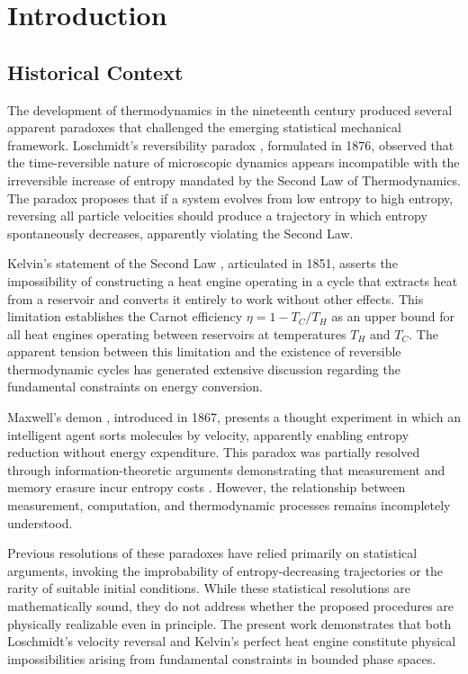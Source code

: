 \section{Introduction}
\label{sec:introduction}

\subsection{Historical Context}

The development of thermodynamics in the nineteenth century produced several apparent paradoxes that challenged the emerging statistical mechanical framework. Loschmidt's reversibility paradox \citep{loschmidt1876}, formulated in 1876, observed that the time-reversible nature of microscopic dynamics appears incompatible with the irreversible increase of entropy mandated by the Second Law of Thermodynamics. The paradox proposes that if a system evolves from low entropy to high entropy, reversing all particle velocities should produce a trajectory in which entropy spontaneously decreases, apparently violating the Second Law.

Kelvin's statement of the Second Law \citep{kelvin1851}, articulated in 1851, asserts the impossibility of constructing a heat engine operating in a cycle that extracts heat from a reservoir and converts it entirely to work without other effects. This limitation establishes the Carnot efficiency $\eta = 1 - T_C/T_H$ as an upper bound for all heat engines operating between reservoirs at temperatures $T_H$ and $T_C$. The apparent tension between this limitation and the existence of reversible thermodynamic cycles has generated extensive discussion regarding the fundamental constraints on energy conversion.

Maxwell's demon \citep{maxwell1871}, introduced in 1867, presents a thought experiment in which an intelligent agent sorts molecules by velocity, apparently enabling entropy reduction without energy expenditure. This paradox was partially resolved through information-theoretic arguments demonstrating that measurement and memory erasure incur entropy costs \citep{landauer1961,bennett1982}. However, the relationship between measurement, computation, and thermodynamic processes remains incompletely understood.

Previous resolutions of these paradoxes have relied primarily on statistical arguments, invoking the improbability of entropy-decreasing trajectories or the rarity of suitable initial conditions. While these statistical resolutions are mathematically sound, they do not address whether the proposed procedures are physically realizable even in principle. The present work demonstrates that both Loschmidt's velocity reversal and Kelvin's perfect heat engine constitute physical impossibilities arising from fundamental constraints in bounded phase spaces.

